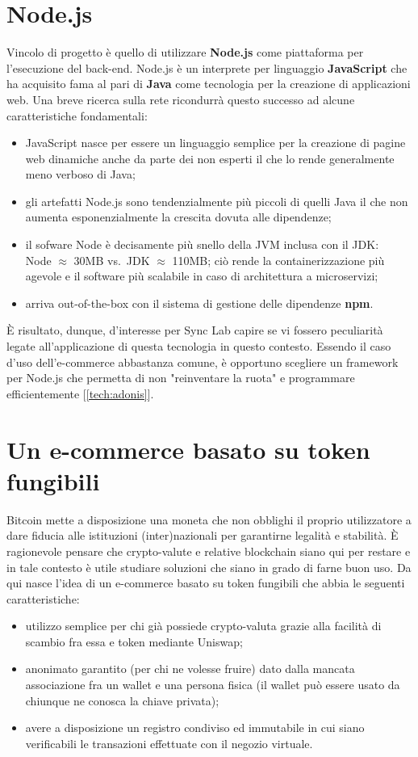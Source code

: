 \newpage

\section{Node.js}
Vincolo di progetto è quello di utilizzare \textbf{Node.js} come piattaforma per l'esecuzione del back-end. Node.js è un interprete per linguaggio \textbf{JavaScript} che ha acquisito fama al pari di \textbf{Java} come tecnologia per la creazione di applicazioni web. Una breve ricerca sulla rete ricondurrà questo successo ad alcune caratteristiche fondamentali:
\begin{itemize}
    \item JavaScript nasce per essere un linguaggio semplice per la creazione di pagine web dinamiche anche da parte dei non esperti il che lo rende generalmente meno verboso di Java;
    \item gli artefatti Node.js sono tendenzialmente più piccoli di quelli Java il che non aumenta esponenzialmente la crescita dovuta alle dipendenze;
    \item il sofware Node è decisamente più snello della JVM inclusa con il JDK:\\
    Node $\approx$ 30MB vs.\ JDK $\approx$ 110MB; ciò rende la containerizzazione più agevole e il software più scalabile in caso di architettura a microservizi;
    \item arriva out-of-the-box con il sistema di gestione delle dipendenze \textbf{npm}.
\end{itemize}
È risultato, dunque, d'interesse per Sync Lab capire se vi fossero peculiarità legate all'applicazione di questa tecnologia in questo contesto. Essendo il caso d'uso dell'e-commerce abbastanza comune, è opportuno scegliere un framework per Node.js che permetta di non "reinventare la ruota" e programmare efficientemente [\autoref{tech:adonis}].

\section{Un e-commerce basato su token fungibili}
Bitcoin mette a disposizione una moneta che non obblighi il proprio utilizzatore a dare fiducia alle istituzioni (inter)nazionali per garantirne legalità e stabilità. È ragionevole pensare che crypto-valute e relative blockchain siano qui per restare e in tale contesto è utile studiare soluzioni che siano in grado di farne buon uso. Da qui nasce l'idea di un e-commerce basato su token fungibili che abbia le seguenti caratteristiche:
\begin{itemize}
    \item utilizzo semplice per chi già possiede crypto-valuta grazie alla facilità di scambio fra essa e token mediante Uniswap;
    \item anonimato garantito (per chi ne volesse fruire) dato dalla mancata associazione fra un wallet e una persona fisica (il wallet può essere usato da chiunque ne conosca la chiave privata);
    \item avere a disposizione un registro condiviso ed immutabile in cui siano verificabili le transazioni effettuate con il negozio virtuale.
\end{itemize}

